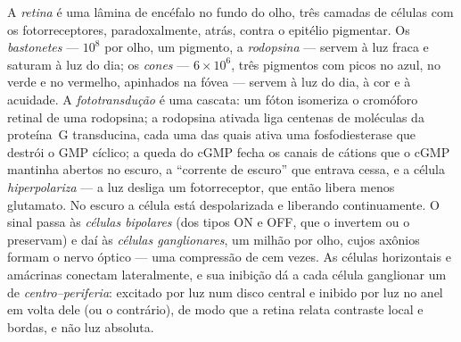 \begin{definition}[A retina]\label{def:b3:sensory-systems:retina}
A \emph{retina} é uma lâmina de encéfalo no fundo do olho, três camadas
de células com os fotorreceptores, paradoxalmente, atrás, contra o
epitélio pigmentar. Os \emph{bastonetes} --- $10^{8}$ por olho, um
pigmento, a \emph{rodopsina} --- servem à luz fraca e saturam à luz do
dia; os \emph{cones} --- $6\times 10^{6}$, três pigmentos com picos no
azul, no verde e no vermelho, apinhados na fóvea --- servem à luz do
dia, à cor e à acuidade. A \emph{fototransdução} é uma cascata: um fóton
isomeriza o cromóforo retinal de uma rodopsina; a rodopsina ativada liga
centenas de moléculas da proteína~G transducina, cada uma das quais
ativa uma fosfodiesterase que destrói o GMP cíclico; a queda do cGMP
fecha os canais de cátions que o cGMP mantinha abertos no escuro, a
``corrente de escuro'' que entrava cessa, e a célula
\emph{hiperpolariza} --- a luz desliga um fotorreceptor, que então
libera menos glutamato. No escuro a célula está despolarizada e
liberando continuamente. O sinal passa às \emph{células bipolares} (dos
tipos ON e OFF, que o invertem ou o preservam) e daí às \emph{células
ganglionares}, um milhão por olho, cujos axônios formam o nervo óptico
--- uma compressão de cem vezes. As células horizontais e amácrinas
conectam lateralmente, e sua inibição dá a cada célula ganglionar um
 de \emph{centro--periferia}: excitado por luz num disco
central e inibido por luz no anel em volta dele (ou o contrário), de
modo que a retina relata contraste local e bordas, e não luz absoluta.
\end{definition}

